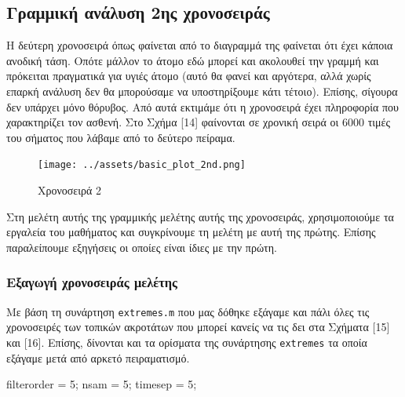 \documentclass[11pt,]{article}
\newenvironment{Shaded}{}{}
\newcommand{\FloatTok}[1]{\textcolor[rgb]{0.25,0.63,0.44}{#1}}
\newcommand{\NormalTok}[1]{#1}
\begin{document}
\hypertarget{ux3b3ux3c1ux3b1ux3bcux3bcux3b9ux3baux3ae-ux3b1ux3bdux3acux3bbux3c5ux3c3ux3b7-2ux3b7ux3c2-ux3c7ux3c1ux3bfux3bdux3bfux3c3ux3b5ux3b9ux3c1ux3acux3c2}{%
\subsection{Γραμμική ανάλυση 2ης
χρονοσειράς}\label{ux3b3ux3c1ux3b1ux3bcux3bcux3b9ux3baux3ae-ux3b1ux3bdux3acux3bbux3c5ux3c3ux3b7-2ux3b7ux3c2-ux3c7ux3c1ux3bfux3bdux3bfux3c3ux3b5ux3b9ux3c1ux3acux3c2}}

Η δεύτερη χρονοσειρά όπως φαίνεται από το διαγραμμά της φαίνεται ότι
έχει κάποια ανοδική τάση. Οπότε μάλλον το άτομο εδώ μπορεί και ακολουθεί
την γραμμή και πρόκειται πραγματικά για υγιές άτομο (αυτό θα φανεί και
αργότερα, αλλά χωρίς επαρκή ανάλυση δεν θα μπορούσαμε να υποστηρίξουμε
κάτι τέτοιο). Επίσης, σίγουρα δεν υπάρχει μόνο θόρυβος. Από αυτά
εκτιμάμε ότι η χρονοσειρά έχει πληροφορία που χαρακτηρίζει τον ασθενή.
Στο Σχήμα {[}14{]} φαίνονται σε χρονική σειρά οι 6000 τιμές του σήματος
που λάβαμε από το δεύτερο πείραμα.

\begin{figure}
\centering
\texttt{[image: ../assets/basic\_plot\_2nd.png]}
\caption{Χρονοσειρά 2}
\end{figure}

Στη μελέτη αυτής της γραμμικής μελέτης αυτής της χρονοσειράς,
χρησιμοποιούμε τα εργαλεία του μαθήματος και συγκρίνουμε τη μελέτη με
αυτή της πρώτης. Επίσης παραλείπουμε εξηγήσεις οι οποίες είναι ίδιες με
την πρώτη.

\hypertarget{ux3b5ux3beux3b1ux3b3ux3c9ux3b3ux3ae-ux3c7ux3c1ux3bfux3bdux3bfux3c3ux3b5ux3b9ux3c1ux3acux3c2-ux3bcux3b5ux3bbux3adux3c4ux3b7ux3c2-1}{%
\subsubsection{Εξαγωγή χρονοσειράς
μελέτης}\label{ux3b5ux3beux3b1ux3b3ux3c9ux3b3ux3ae-ux3c7ux3c1ux3bfux3bdux3bfux3c3ux3b5ux3b9ux3c1ux3acux3c2-ux3bcux3b5ux3bbux3adux3c4ux3b7ux3c2-1}}

Με βάση τη συνάρτηση \texttt{extremes.m} που μας δόθηκε εξάγαμε και πάλι
όλες τις χρονοσειρές των τοπικών ακροτάτων που μπορεί κανείς να τις δει
στα Σχήματα {[}15{]} και {[}16{]}. Επίσης, δίνονται και τα ορίσματα της
συνάρτησης \texttt{extremes} τα οποία εξάγαμε μετά από αρκετό
πειραματισμό.

\begin{Shaded}
\begin{Highlighting}[]
\NormalTok{filterorder = }\FloatTok{5}\NormalTok{;}
\NormalTok{nsam = }\FloatTok{5}\NormalTok{;}
\NormalTok{timesep = }\FloatTok{5}\NormalTok{;}
\end{Highlighting}
\end{Shaded}
\end{document}
